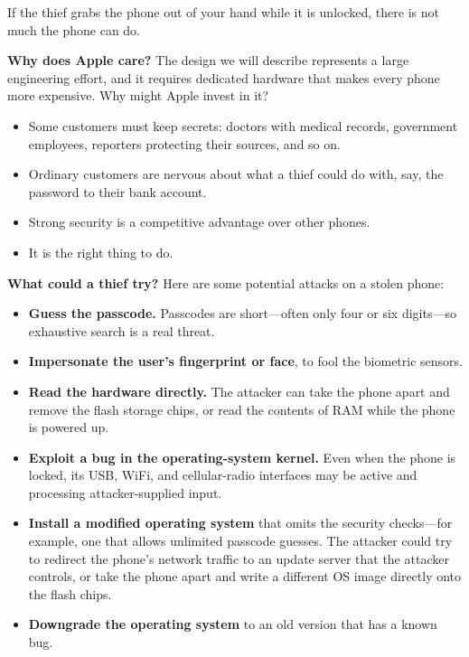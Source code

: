 \documentclass[
  letterpaper,
]{scrbook}
\providecommand{\tightlist}{%
  \setlength{\itemsep}{0pt}\setlength{\parskip}{0pt}}
\theoremstyle{definition}
\theoremstyle{plain}
\theoremstyle{plain}
\theoremstyle{remark}
\begin{document}
If the thief grabs the phone out of your hand while it is unlocked,
there is not much the phone can do.

\textbf{Why does Apple care?} The design we will describe represents a
large engineering effort, and it requires dedicated hardware that makes
every phone more expensive. Why might Apple invest in it?

\begin{itemize}
\tightlist
\item
  Some customers must keep secrets: doctors with medical records,
  government employees, reporters protecting their sources, and so on.
\item
  Ordinary customers are nervous about what a thief could do with, say,
  the password to their bank account.
\item
  Strong security is a competitive advantage over other phones.
\item
  It is the right thing to do.
\end{itemize}

\textbf{What could a thief try?} Here are some potential attacks on a
stolen phone:

\begin{itemize}
\tightlist
\item
  \textbf{Guess the passcode.} Passcodes are short---often only four or
  six digits---so exhaustive search is a real threat.
\item
  \textbf{Impersonate the user's fingerprint or face}, to fool the
  biometric sensors.
\item
  \textbf{Read the hardware directly.} The attacker can take the phone
  apart and remove the flash storage chips, or read the contents of RAM
  while the phone is powered up.
\item
  \textbf{Exploit a bug in the operating-system kernel.} Even when the
  phone is locked, its USB, WiFi, and cellular-radio interfaces may be
  active and processing attacker-supplied input.
\item
  \textbf{Install a modified operating system} that omits the security
  checks---for example, one that allows unlimited passcode guesses. The
  attacker could try to redirect the phone's network traffic to an
  update server that the attacker controls, or take the phone apart and
  write a different OS image directly onto the flash chips.
\item
  \textbf{Downgrade the operating system} to an old version that has a
  known bug.
\end{itemize}
\end{document}
